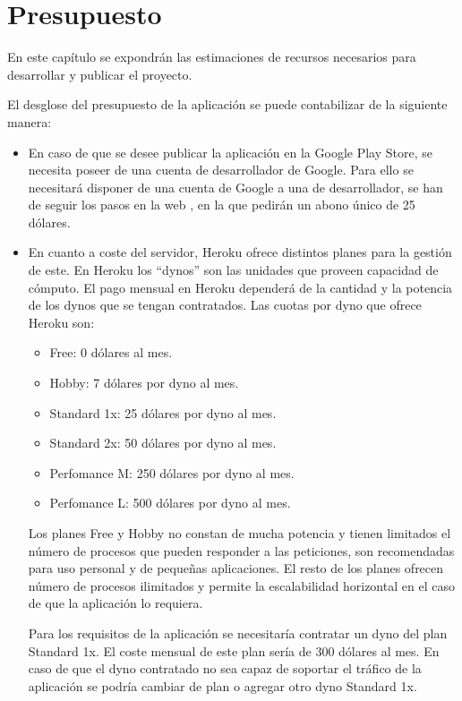 
\chapter{Presupuesto} \label{chap:RAEntornosUniversitarios} 

En este capítulo se expondrán las estimaciones de recursos necesarios para
desarrollar y publicar el proyecto.

El desglose del presupuesto de la aplicación se puede contabilizar de la siguiente manera:

\begin{itemize}
    \item En caso de que se desee publicar la aplicación en la Google Play Store, se necesita poseer de una cuenta de desarrollador de Google. Para ello se necesitará disponer de una cuenta de Google a una de desarrollador, se han de seguir los pasos en la web \cite{URL::googleplayconsole}, en la que pedirán un abono único de 25 dólares.  
    \item En cuanto a coste del servidor, Heroku ofrece distintos planes para la gestión de este.  En Heroku los ``dynos'' son las unidades que proveen capacidad de cómputo. El pago mensual en Heroku dependerá de la cantidad y la potencia de los dynos que se tengan contratados. Las cuotas por dyno que ofrece Heroku son:
    \begin{itemize}
        \item Free: 0 dólares al mes. 
        \item Hobby: 7 dólares por dyno al mes.
        \item Standard 1x: 25 dólares por dyno al mes.
        \item Standard 2x: 50 dólares por dyno al mes.
        \item Perfomance M: 250 dólares por dyno al mes.
        \item Perfomance L: 500 dólares por dyno al mes.
    \end{itemize}
    
    Los planes Free y Hobby no constan de mucha potencia y tienen limitados el número de procesos que pueden responder a las peticiones, son recomendadas para uso personal y de pequeñas aplicaciones. El resto de los planes ofrecen número de procesos ilimitados y permite la escalabilidad horizontal en el caso de que la aplicación lo requiera.

    Para los requisitos de la aplicación se necesitaría contratar  un dyno del plan Standard 1x. El coste mensual de este plan sería de 300 dólares al mes.
    En caso de que el dyno contratado no sea capaz de soportar el tráfico de la aplicación se podría cambiar de plan o agregar otro dyno Standard 1x. 


\end{itemize}
